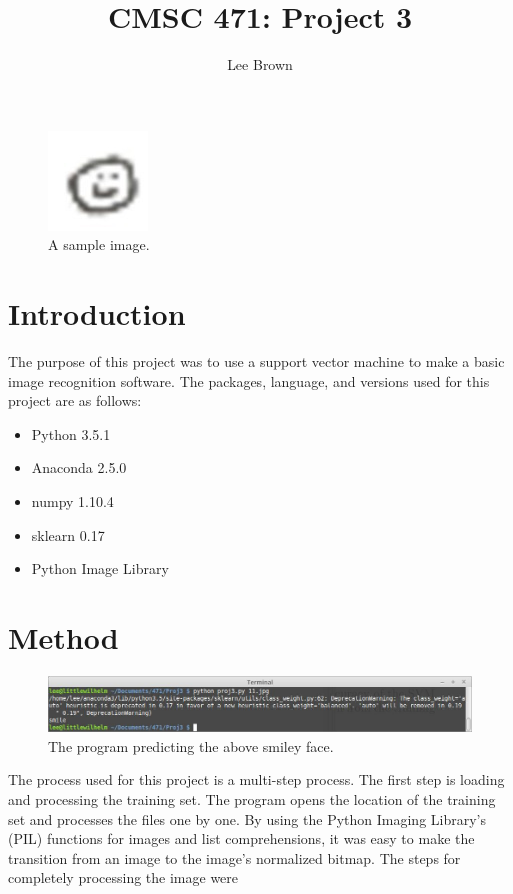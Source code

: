 \documentclass{article}
\begin{document}
\title{CMSC 471: Project 3}
\author{Lee Brown}

\maketitle

\begin{figure}[h!]
  \centering
  \includegraphics[scale=.5]{11.jpg}
  \caption{A sample image.}
\end{figure}

\section{Introduction}
The purpose of this project was to use a support vector machine to make a basic image recognition software. The packages, language, and versions used for this project are as follows:

\begin{itemize}
\item Python 3.5.1
\item Anaconda 2.5.0 
\item numpy 1.10.4
\item sklearn 0.17
\item Python Image Library
\end{itemize}

\section{Method}

\begin{figure}[h!]
  \centering
  \includegraphics[scale=.40]{prediction.jpg}
  \caption{The program predicting the above smiley face.}
\end{figure}

The process used for this project is a multi-step process. The first step is loading and processing the training set. The program opens the location of the training set and processes the files one by one. By using the Python Imaging Library’s (PIL) functions for images and list comprehensions, it was easy to make the transition from an image to the image’s normalized bitmap. The steps for completely processing the image were
\end{document}
